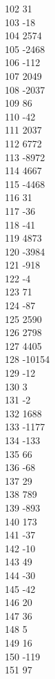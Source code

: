 { 102	31 \\
 103	-18 \\
 104	2574 \\
 105	-2468 \\
 106	-112 \\
 107	2049 \\
 108	-2037 \\
 109	86 \\
 110	-42 \\
 111	2037 \\
 112	6772 \\
 113	-8972 \\
 114	4667 \\
 115	-4468 \\
 116	31 \\
 117	-36 \\
 118	-41 \\
 119	4873 \\
 120	-3984 \\
 121	-918 \\
 122	-4 \\
 123	71 \\
 124	-87 \\
 125	2590 \\
 126	2798 \\
 127	4405 \\
 128	-10154 \\
 129	-12 \\
 130	3 \\
 131	-2 \\
 132	1688 \\
 133	-1177 \\
 134	-133 \\
 135	66 \\
 136	-68 \\
 137	29 \\
 138	789 \\
 139	-893 \\
 140	173 \\
 141	-37 \\
 142	-10 \\
 143	49 \\
 144	-30 \\
 145	-42 \\
 146	20 \\
 147	36 \\
 148	5 \\
 149	16 \\
 150	-119 \\
 151	97 \\
}
